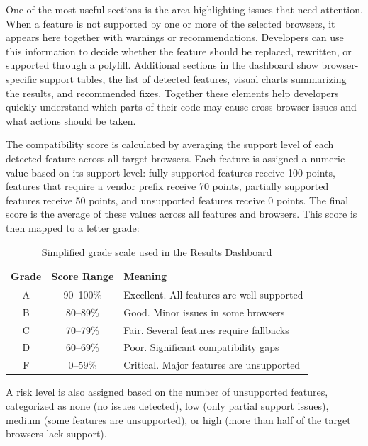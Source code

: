 One of the most useful sections is the area highlighting issues that need attention. When a feature is not supported by one or more of the selected browsers, it appears here together with warnings or recommendations. Developers can use this information to decide whether the feature should be replaced, rewritten, or supported through a polyfill. Additional sections in the dashboard show browser-specific support tables, the list of detected features, visual charts summarizing the results, and recommended fixes. Together these elements help developers quickly understand which parts of their code may cause cross-browser issues and what actions should be taken.

The compatibility score is calculated by averaging the support level of each detected feature across all target browsers. Each feature is assigned a numeric value based on its support level: fully supported features receive 100 points, features that require a vendor prefix receive 70 points, partially supported features receive 50 points, and unsupported features receive 0 points. The final score is the average of these values across all features and browsers. This score is then mapped to a letter grade:

\begin{table}[H]
    \centering
    \begin{tabular}{|c|c|l|}
        \hline
        \textbf{Grade} & \textbf{Score Range} & \textbf{Meaning} \\
        \hline \hline
        A & 90--100\% & Excellent. All features are well supported \\ \hline
        B & 80--89\%  & Good. Minor issues in some browsers \\ \hline
        C & 70--79\%  & Fair. Several features require fallbacks \\ \hline
        D & 60--69\%  & Poor. Significant compatibility gaps \\ \hline
        F & 0--59\%   & Critical. Major features are unsupported \\ \hline
    \end{tabular}
    \caption{Simplified grade scale used in the Results Dashboard}
    \label{tab:gui-grades}
\end{table}

A risk level is also assigned based on the number of unsupported features, categorized as none (no issues detected), low (only partial support issues), medium (some features are unsupported), or high (more than half of the target browsers lack support).

